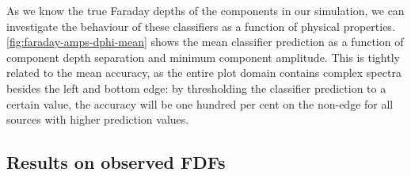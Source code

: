 \documentclass[11pt, a4paper]{book}
\begin{document}
    As we know the true Faraday depths of the components in our simulation, we can investigate the behaviour of these classifiers as a function of physical properties. \autoref{fig:faraday-amps-dphi-mean} shows the mean classifier prediction as a function of component depth separation and minimum component amplitude. This is tightly related to the mean accuracy, as the entire plot domain contains complex spectra besides the left and bottom edge: by thresholding the classifier prediction to a certain value, the accuracy will be one hundred per cent on the non-edge for all sources with higher prediction values.

  \subsection{Results on observed FDFs}
  \label{sec:faraday-results-observed}
\end{document}
